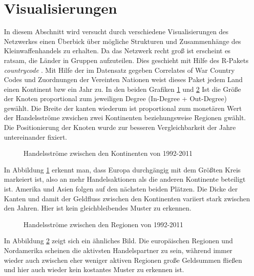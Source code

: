 \documentclass[a4paper,ngerman,oneside,titlepage,bibliography=totoc,11pt]{scrreprt}
\begin{document}
\newpage
\section{Visualisierungen}

In diesem Abschnitt wird versucht durch verschiedene Visualisierungen des Netzwerkes einen Überbick über mögliche Strukturen und Zusammenhänge des Kleinwaffenhandels zu erhalten. Da das Netzwerk recht groß ist erscheint es ratsam, die Länder in Gruppen aufzuteilen. Dies geschieht mit Hilfe des R-Pakets \emph{countrycode} \cite{countrycode}. Mit Hilfe der im Datensatz gegeben Correlates of War Country Codes und Zuordnungen der Vereinten Nationen weist dieses Paket jedem Land einen Kontinent bzw ein Jahr zu. In den beiden Grafiken \ref{fig:cont} und \ref{fig:reg} Ist die Größe der Knoten proportional zum jeweiligen Degree (In-Degree + Out-Degree) gewählt. Die Breite der kanten wiederum ist proportional zum monetären Wert der Handelsströme zwsichen zwei Kontinenten beziehungsweise Regionen gwählt. Die Positionierung der Knoten wurde zur besseren Vergleichbarkeit der Jahre untereinander fixiert.

\begin{figure}[!h]
\centering
{}
\caption{Handelsströme zwischen den Kontinenten von 1992-2011}
\label{fig:cont}
\end{figure}

In Abbildung \ref{fig:cont} erkennt man, dass Europa durchgängig mit dem Größten Kreis markeiert ist, also an mehr Handelsaktionen als die anderen Kontinente beteiligt ist. Amerika und Asien folgen auf den nächsten beiden Plätzen. Die Dicke der Kanten und damit der Geldfluss zwischen den Kontinenten variiert stark zwischen den Jahren. Hier ist kein gleichbleibendes Muster zu erkennen.

\begin{figure}[!h]
\centering
{}
\caption{Handelsströme zwischen den Regionen von 1992-2011}
\label{fig:reg}
\end{figure}

In Abbildung \ref{fig:reg} zeigt sich ein ähnliches Bild. Die europäischen Regionen und Nordamerika scheinen die aktivsten Handelspartner zu sein, während immer wieder auch zwischen eher weniger aktiven Regionen große Geldsummen fließen und hier auch wieder kein kostantes Muster zu erkennen ist.  
\end{document}
